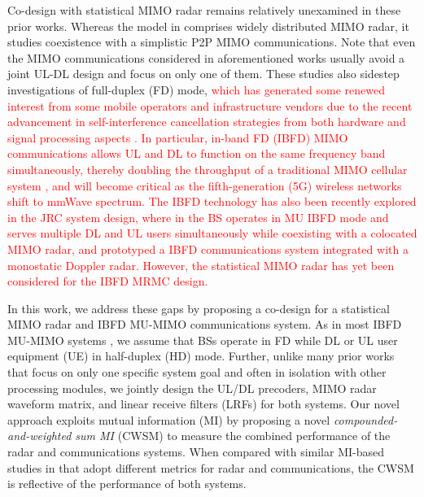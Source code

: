 \documentclass[10pt,journal]{IEEEtran}
\theoremstyle{definition}
\begin{document}
Co-design with statistical MIMO radar remains relatively unexamined in these prior works. Whereas the model in \cite{he2019performance} comprises widely distributed MIMO radar, it studies coexistence with a simplistic P2P MIMO communications. Note that even the MIMO communications considered in aforementioned works usually avoid a joint UL-DL design and focus on only one of them. These studies also sidestep investigations of full-duplex (FD) mode, \textcolor{red}{which has generated some renewed interest from some mobile operators and infrastructure vendors due to the recent advancement in self-interference cancellation strategies from both hardware and signal processing aspects \cite{roberts2020millimeter}. In particular, in-band FD (IBFD) MIMO communications allows UL and DL to function on the same frequency band simultaneously, thereby doubling the throughput of a traditional MIMO cellular system \cite{roberts2020millimeter,Hassani2020IBFD,FD_WMMSE}, and will become critical as the fifth-generation (5G) wireless networks shift to mmWave spectrum\cite{roberts2020millimeter}. %
The IBFD technology has also been recently explored in the JRC system design, where in \cite{biswas2018fdqos} the BS operates in MU IBFD mode and serves multiple DL and UL users simultaneously while coexisting with a colocated MIMO radar, and \cite{Hassani2020IBFD} prototyped a IBFD communications system integrated with a monostatic Doppler radar. However, the statistical MIMO radar has yet been considered for the IBFD MRMC design. } 

In this work, we address these gaps by proposing a co-design for a statistical MIMO radar and IBFD MU-MIMO communications system. As in most IBFD MU-MIMO systems \cite{biswas2018fdqos,singh2018transceiver,FD_WMMSE}, we assume that BSs operate in FD while DL or UL user equipment (UE) in half-duplex (HD) mode. Further, unlike many prior works that focus on only one specific system goal and often in isolation with other processing modules, we jointly design the UL/DL precoders, MIMO radar waveform matrix, and linear receive filters (LRFs) for both systems. Our novel approach exploits mutual information (MI) by proposing a novel \textit{compounded-and-weighted sum MI} (CWSM) to measure the combined performance of the radar and communications systems. When compared with similar MI-based studies in \cite{biswas2018fdqos,singh2018transceiver,he2019performance} that adopt different metrics for radar and communications, the CWSM is reflective of the performance of both systems. 
\end{document}
